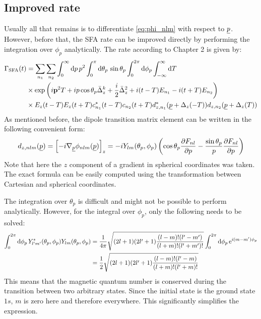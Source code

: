 \subsection*{Improved rate}
Usually all that remains is to differentiate \eqref{eq:phi_nlm} with respect to $\underline{p}$.
However, before that, the SFA rate can be improved directly by performing the integration over $\phi_p$ analytically.
The rate according to Chapter 2 is given by:
\begin{align*}
    \Gamma_{\mathrm{SFA}}(t) &= \sum_{n_1}\sum_{n_2} \int_0^{\infty} \mathrm{d} p\,p^2\int_0^{\pi} \mathrm{d}\theta_p\,\sin\theta_p \int_0^{2\pi}\mathrm{d} \phi_p\int_{-\infty}^{\infty} \mathrm{d} T\\
    &\times \exp\left(i\mathbf{p}^2T + ip\cos\theta_p\bar{\Delta}_z^k +  \frac{i}{2}\bar{\Delta}_z^2  + i(t-T)E_{n_1}-i(t+T)E_{n_2}\right)\\
    &\times E_z(t-T) E_z(t+T)c_{n_1}^*(t-T)c_{n_2}(t+T) d_{z,n_1}^*(\underline{p}+\Delta_z(-T))d_{z,n_2}(\underline{p}+\Delta_z(T))
\end{align*}
As mentioned before, the dipole transition matrix element can be written in the following convenient form:
\begin{equation*}
    d_{z,nlm}(\underline{p}) = \left[-i\nabla_{\underline{p}}\phi_{nlm}(\underline{p})\right]_z = -iY_{lm}(\theta_p, \phi_p)\left(\cos\theta_p\frac{\partial F_{nl}}{\partial p}-\frac{\sin\theta_p}{p}\frac{\partial F_{nl}}{\partial p}\right)
\end{equation*}
Note that here the $z$ component of a gradient in spherical coordinates was taken. The exact formula can be easily computed using the transformation between Cartesian and spherical coordinates.

The integration over $\theta_p$ is difficult and might not be possible to perform analytically.
However, for the integral over $\phi_p$, only the following needs to be solved:
\begin{align*}
    \int_{0}^{2\pi}\mathrm{d} \phi_p\, Y_{l'm'}^*(\theta_p, \phi_p) Y_{lm}(\theta_p, \phi_p) &= \frac{1}{4\pi}\sqrt{(2l+1)(2l'+1)\frac{(l-m)!(l'-m')}{(l+m)!(l'+m')!}}\int_{0}^{2\pi}\mathrm{d} \phi_p\, \mathrm{e}^{i(m-m')\phi_p}\\
    &= \frac{1}{2}\sqrt{(2l+1)(2l'+1)\frac{(l-m)!(l'-m)}{(l+m)!(l'+m)!}}
\end{align*}
This means that the magnetic quantum number is conserved during the transition between two arbitrary states.
Since the initial state is the ground state $1s$, $m$ is zero here and therefore everywhere.
This significantly simplifies the expression.







